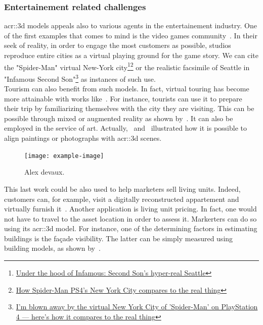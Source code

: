         \subsubsection{Entertainement related challenges}
            \gls{acr::3d} models appeals also to various agents in the entertainement industry.
            One of the first examples that comes to mind is the video games community~\parencite{watson2008procedural}.
            In their seek of reality, in order to engage the most customers as possible, studios reproduce entire cities as a virtual playing ground for the game story.
            We can cite the "Spider-Man" virtual New-York city\footnote{
                \href{https://www.polygon.com/2013/9/25/4702318/under-the-hood-of-infamous-second-son-hyper-real-seattle}{Under the hood of Infamous: Second Son's hyper-real Seattle}
            }\footnote{
                \href{https://www.polygon.com/e3/2018/6/12/17453588/spider-man-ps4-new-york-city-avengers-demo-preview}{How Spider-Man PS4’s New York City compares to the real thing}
            } or the realistic facsimile of Seattle in "Infamous Second Son"\footnote{
                \href{http://www.businessinsider.fr/us/spider-man-ps4-new-york-city-2018-9}{I'm blown away by the virtual New York City of 'Spider-Man' on PlayStation 4 — here's how it compares to the real thing}
            } as instances of such use.\\
            Tourism can also benefit from such models.
            In fact, virtual touring has become more attainable with works like~\textcite{koutsoudis20073d}.
            For instance, tourists can use it to prepare their trip by familiarizing themselves with the city they are visiting.
            This can be possible through mixed or augmented reality as shown by~\textcite{devaux20183d}.
            It can also be employed in the service of art.
            Actually,~\textcite{aubry2014painting} and~\textcite{russell2011automatic} illustrated how it is possible to align paintings or photographs with \gls{acr::3d} scenes.\\
            \begin{figure}[htpb]
                \centering
                \texttt{[image: example-image]}            
                \caption{
                    \label{fig::augemented_reality} Alex devaux.
                }
            \end{figure}
            This last work could be also used to help marketers sell living units.
            Indeed, customers can, for example, visit a digitally reconstructed appartement and virtually furnish it~\parencite{kim2019planar}.
            Another application is living unit pricing.
            In fact, one would not have to travel to the asset location in order to assess it.
            Markerters can do so using its \gls{acr::3d} model.
            For instance, one of the determining factors in estimating buildings is the fa\c{c}ade visibility.
            The latter can be simply measured using building models, as shown by~\textcite{albrecht2013assessing}.

